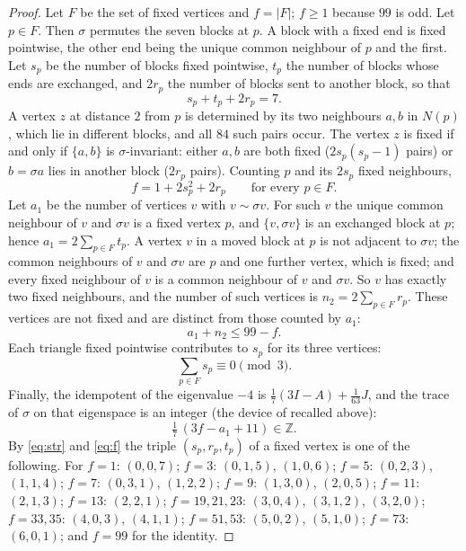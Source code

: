 \documentclass[11pt]{amsart}
\theoremstyle{definition}
\theoremstyle{remark}
\newcommand{\Z}{\mathbb{Z}}
\newcommand{\s}{\sigma}
\begin{document}
\begin{proof}
Let $F$ be the set of fixed vertices and $f=|F|$; $f\ge 1$ because $99$ is odd. Let $p\in F$. Then $\s$ permutes the seven
blocks at $p$. A block with a fixed end is fixed pointwise, the other end being the unique common neighbour of $p$ and the
first. Let $s_p$ be the number of blocks fixed pointwise, $t_p$ the number of blocks whose ends are exchanged, and $2r_p$ the
number of blocks sent to another block, so that
\begin{equation}\label{eq:str}
s_p+t_p+2r_p=7 .
\end{equation}
A vertex $z$ at distance $2$ from $p$ is determined by its two neighbours $a,b$ in $N(p)$, which lie in different blocks, and
all $84$ such pairs occur. The vertex $z$ is fixed if and only if $\{a,b\}$ is $\s$-invariant: either $a,b$ are both fixed
($2s_p(s_p-1)$ pairs) or $b=\s a$ lies in another block ($2r_p$ pairs). Counting $p$ and its $2s_p$ fixed neighbours,
\begin{equation}\label{eq:f}
f=1+2s_p^2+2r_p\qquad\text{for every } p\in F .
\end{equation}
Let $a_1$ be the number of vertices $v$ with $v\sim\s v$. For such $v$ the unique common neighbour of $v$ and $\s v$ is a fixed
vertex $p$, and $\{v,\s v\}$ is an exchanged block at $p$; hence $a_1=2\sum_{p\in F}t_p$. A vertex $v$ in a moved block at $p$
is not adjacent to $\s v$; the common neighbours of $v$ and $\s v$ are $p$ and one further vertex, which is fixed; and every
fixed neighbour of $v$ is a common neighbour of $v$ and $\s v$. So $v$ has exactly two fixed neighbours, and the number of
such vertices is $n_2=2\sum_{p\in F}r_p$. These vertices are not fixed and are distinct from those counted by $a_1$:
\begin{equation}\label{eq:a1n2}
a_1+n_2\le 99-f .
\end{equation}
Each triangle fixed pointwise contributes to $s_p$ for its three vertices:
\begin{equation}\label{eq:mod3}
\textstyle\sum_{p\in F}s_p\equiv 0 \pmod 3 .
\end{equation}
Finally, the idempotent of the eigenvalue $-4$ is $\frac17(3I-A)+\frac1{63}J$, and the trace of $\s$ on that eigenspace is an integer (the device of \cite{MM} recalled above):
\begin{equation}\label{eq:trace}
\tfrac17\,(3f-a_1+11)\in\Z .
\end{equation}
By \eqref{eq:str} and \eqref{eq:f} the triple $(s_p,r_p,t_p)$ of a fixed vertex is one of the following. For $f=1$: $(0,0,7)$;
$f=3$: $(0,1,5)$, $(1,0,6)$; $f=5$: $(0,2,3)$, $(1,1,4)$; $f=7$: $(0,3,1)$, $(1,2,2)$; $f=9$: $(1,3,0)$, $(2,0,5)$; $f=11$:
$(2,1,3)$; $f=13$: $(2,2,1)$; $f=19,21,23$: $(3,0,4)$, $(3,1,2)$, $(3,2,0)$; $f=33,35$: $(4,0,3)$, $(4,1,1)$; $f=51,53$:
$(5,0,2)$, $(5,1,0)$; $f=73$: $(6,0,1)$; and $f=99$ for the identity.


\end{proof}
\end{document}
